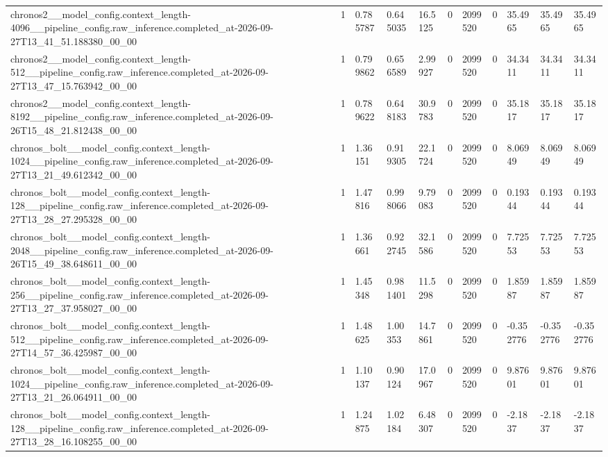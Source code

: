 \begin{tabular}{lllllllllll}
chronos2\_\_model\_config.context\_length-4096\_\_pipeline\_config.raw\_inference.completed\_at-2026-09-27T13\_41\_51.188380\_00\_00 & 1 & 0.785787 & 0.645035 & 16.5125 & 0 & 2099520 & 0 & 35.4965 & 35.4965 & 35.4965 \\
chronos2\_\_model\_config.context\_length-512\_\_pipeline\_config.raw\_inference.completed\_at-2026-09-27T13\_47\_15.763942\_00\_00 & 1 & 0.799862 & 0.656589 & 2.99927 & 0 & 2099520 & 0 & 34.3411 & 34.3411 & 34.3411 \\
chronos2\_\_model\_config.context\_length-8192\_\_pipeline\_config.raw\_inference.completed\_at-2026-09-26T15\_48\_21.812438\_00\_00 & 1 & 0.789622 & 0.648183 & 30.9783 & 0 & 2099520 & 0 & 35.1817 & 35.1817 & 35.1817 \\
chronos\_bolt\_\_model\_config.context\_length-1024\_\_pipeline\_config.raw\_inference.completed\_at-2026-09-27T13\_21\_49.612342\_00\_00 & 1 & 1.36151 & 0.919305 & 22.1724 & 0 & 2099520 & 0 & 8.06949 & 8.06949 & 8.06949 \\
chronos\_bolt\_\_model\_config.context\_length-128\_\_pipeline\_config.raw\_inference.completed\_at-2026-09-27T13\_28\_27.295328\_00\_00 & 1 & 1.47816 & 0.998066 & 9.79083 & 0 & 2099520 & 0 & 0.19344 & 0.19344 & 0.19344 \\
chronos\_bolt\_\_model\_config.context\_length-2048\_\_pipeline\_config.raw\_inference.completed\_at-2026-09-26T15\_49\_38.648611\_00\_00 & 1 & 1.36661 & 0.922745 & 32.1586 & 0 & 2099520 & 0 & 7.72553 & 7.72553 & 7.72553 \\
chronos\_bolt\_\_model\_config.context\_length-256\_\_pipeline\_config.raw\_inference.completed\_at-2026-09-27T13\_27\_37.958027\_00\_00 & 1 & 1.45348 & 0.981401 & 11.5298 & 0 & 2099520 & 0 & 1.85987 & 1.85987 & 1.85987 \\
chronos\_bolt\_\_model\_config.context\_length-512\_\_pipeline\_config.raw\_inference.completed\_at-2026-09-27T14\_57\_36.425987\_00\_00 & 1 & 1.48625 & 1.00353 & 14.7861 & 0 & 2099520 & 0 & -0.352776 & -0.352776 & -0.352776 \\
chronos\_bolt\_\_model\_config.context\_length-1024\_\_pipeline\_config.raw\_inference.completed\_at-2026-09-27T13\_21\_26.064911\_00\_00 & 1 & 1.10137 & 0.90124 & 17.0967 & 0 & 2099520 & 0 & 9.87601 & 9.87601 & 9.87601 \\
chronos\_bolt\_\_model\_config.context\_length-128\_\_pipeline\_config.raw\_inference.completed\_at-2026-09-27T13\_28\_16.108255\_00\_00 & 1 & 1.24875 & 1.02184 & 6.48307 & 0 & 2099520 & 0 & -2.1837 & -2.1837 & -2.1837 \\

\end{tabular}
